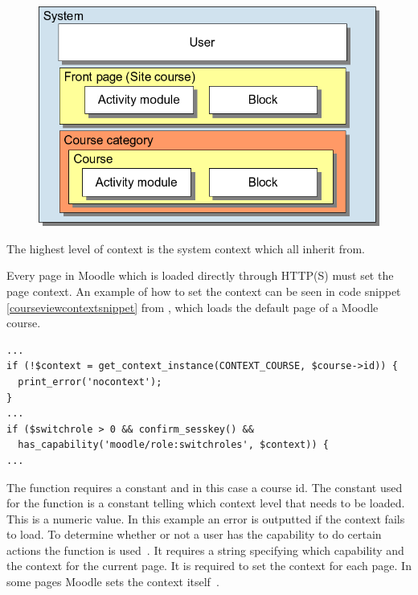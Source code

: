  \begin{figure}
	 \centering
		 \includegraphics[width=\textwidth]{images/moodle-contexts.png}
	 \label{fig:moodlecontexts}
 \end{figure}

The highest level of context is the system context which all inherit from. 

Every page in Moodle which is loaded directly through HTTP(S) must set the page context. 
An example of how to set the context can be seen in code snippet \ref{courseviewcontextsnippet} from , which loads the default page of a Moodle course.

\begin{lstlisting}[style=phpCode, caption=\myCaption{A snippet from \moodlefile{/course/view.php}}, label=courseviewcontextsnippet]
...
if (!$context = get_context_instance(CONTEXT_COURSE, $course->id)) {
  print_error('nocontext');
}
...
if ($switchrole > 0 && confirm_sesskey() &&
  has_capability('moodle/role:switchroles', $context)) {
...	
\end{lstlisting}
The function  requires a constant and in this case a course id. 
The constant used for the function is a constant telling which context level that needs to be loaded. 
This is a numeric value. 
In this example an error is outputted if the context fails to load. 
To determine whether or not a user has the capability to do certain actions the function  is used~\cite{moodlerolesandmodules}.
It requires a string specifying which capability and the context for the current page. 
It is required to set the context for each page. 
In some pages Moodle sets the context itself~\cite{moodlepageapi}. 

